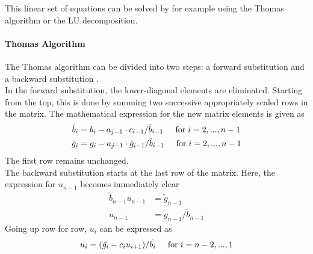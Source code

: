\documentclass[%
oneside,                 %
final,                   %
10pt]{article}
\begin{document}
This linear set of equations can be solved by for example using the Thomas algorithm or the LU decomposition.
\paragraph{Thomas Algorithm}
The Thomas algorithm can be divided into two steps: a forward substitution and a backward substitution \cite{ThomasAlgo}.\\
In the forward substitution, the lower-diagonal elements are eliminated. Starting from the top, this is done by summing two successive appropriately scaled rows in the matrix. The mathematical expression for the new matrix elements is given as
\begin{equation}
\begin{aligned}
\tilde{b}_i &= b_i - a_{j-1} \cdot c_{i-1}/ \tilde{b}_{i-1}  \hspace{0.5cm} \mathrm{for} \hspace{0.1cm} i=2,..., n-1 \\
\tilde{g}_i &= g_i - a_{j-1} \cdot \tilde{g}_{i-1} / \tilde{b}_{i-1}  \hspace{0.5cm} \mathrm{for} \hspace{0.1cm} i=2,..., n-1
\end{aligned}
\end{equation}
The first row remains unchanged. \\
The backward substitution starts at the last row of the matrix. Here, the expression for $u_{n-1}$ becomes immediately clear
\begin{equation}
\begin{aligned}
\tilde{b}_{n-1} u_{n-1} &= \tilde{g}_{n-1} \\
u_{n-1} &= \tilde{g}_{n-1} / \tilde{b}_{n-1}
\end{aligned}
\end{equation}
Going up row for row, $u_i$ can be expressed as
\begin{equation}
u_i = ( \tilde{g_i}-c_i u_{i+1} )/ \tilde{b_i} \hspace{0.5cm} \mathrm{for} \hspace{0.1cm} i=n-2,...,1 
\end{equation}
\end{document}
